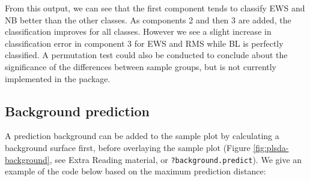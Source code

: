 \documentclass[]{book}
\newenvironment{Shaded}{\begin{snugshade}}{\end{snugshade}}
\newcommand{\DataTypeTok}[1]{\textcolor[rgb]{0.13,0.29,0.53}{#1}}
\newcommand{\DecValTok}[1]{\textcolor[rgb]{0.00,0.00,0.81}{#1}}
\newcommand{\KeywordTok}[1]{\textcolor[rgb]{0.13,0.29,0.53}{\textbf{#1}}}
\newcommand{\NormalTok}[1]{#1}
\newcommand{\OperatorTok}[1]{\textcolor[rgb]{0.81,0.36,0.00}{\textbf{#1}}}
\newcommand{\OtherTok}[1]{\textcolor[rgb]{0.56,0.35,0.01}{#1}}
\newcommand{\StringTok}[1]{\textcolor[rgb]{0.31,0.60,0.02}{#1}}
\begin{document}
From this output, we can see that the first component tends to classify EWS and NB better than the other classes. As components 2 and then 3 are added, the classification improves for all classes. However we see a slight increase in classification error in component 3 for EWS and RMS while BL is perfectly classified. A permutation test could also be conducted to conclude about the significance of the differences between sample groups, but is not currently implemented in the package.

\hypertarget{ex:plsda:background}{%
\subsection{Background prediction}\label{ex:plsda:background}}

A prediction background can be added to the sample plot by calculating a background surface first, before overlaying the sample plot (Figure \ref{fig:plsda-background}, see Extra Reading material, or \texttt{?background.predict}). We give an example of the code below based on the maximum prediction distance:

\begin{Shaded}
\end{Shaded}
\end{document}
